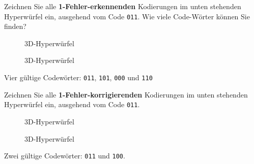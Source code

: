 \begin{myexercise}
    Zeichnen Sie alle \textbf{1-Fehler-erkennenden} Kodierungen im unten stehenden Hyperwürfel ein, ausgehend vom Code \texttt{011}. Wie viele Code-Wörter können Sie finden?
    \begin{figure}[H]
        \centering
        \caption{3D-Hyperwürfel}
    \end{figure}

    \begin{myanswer}

        \begin{figure}[H]
            \centering
            \caption{3D-Hyperwürfel}
        \end{figure}
        Vier gültige Codewörter: \texttt{011}, \texttt{101}, \texttt{000} und \texttt{110}
    \end{myanswer}

\end{myexercise}

\begin{myexercise}
    Zeichnen Sie alle \textbf{1-Fehler-korrigierenden} Kodierungen im unten stehenden Hyperwürfel ein, ausgehend vom Code \texttt{011}.
    \begin{figure}[H]
        \centering
        \caption{3D-Hyperwürfel}
    \end{figure}


    \begin{myanswer}

        \begin{figure}[H]
            \centering
            \caption{3D-Hyperwürfel}
        \end{figure}
        Zwei gültige Codewörter: \texttt{011} und \texttt{100}.
    \end{myanswer}

\end{myexercise}

